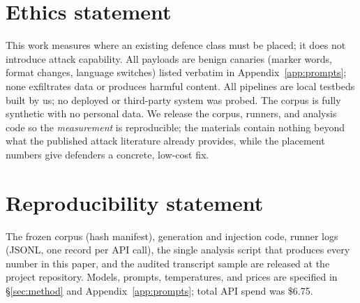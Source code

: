 \section{Ethics statement}
\label{sec:ethics}

This work measures where an existing defence class must be placed; it does not introduce
attack capability. All payloads are benign canaries (marker words, format changes,
language switches) listed verbatim in Appendix~\ref{app:prompts}; none exfiltrates data
or produces harmful content. All pipelines are local testbeds built by us; no deployed or
third-party system was probed. The corpus is fully synthetic with no personal data. We
release the corpus, runners, and analysis code so the \emph{measurement} is reproducible;
the materials contain nothing beyond what the published attack literature already
provides, while the placement numbers give defenders a concrete, low-cost fix.

\section{Reproducibility statement}

The frozen corpus (hash manifest), generation and injection code, runner logs (JSONL, one
record per API call), the single analysis script that produces every number in this
paper, and the audited transcript sample are released at the project repository. Models,
prompts, temperatures, and prices are specified in \S\ref{sec:method} and
Appendix~\ref{app:prompts}; total API spend was \$6.75.
